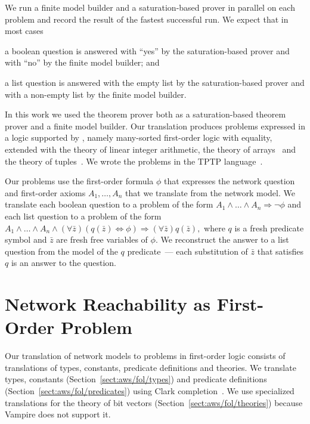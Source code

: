 

We run a finite model builder and a saturation-based prover in parallel on each problem and record the result of the fastest successful run. We expect that in most cases
\begin{enumerate*}[label=(\roman*)]
  \item a boolean question is answered with ``yes'' by the saturation-based prover and with ``no'' by the finite model builder; and
  \item a list question is answered with the empty list by the saturation-based prover and with a non-empty list by the finite model builder.
\end{enumerate*}

In this work we used the \vampire theorem prover both as a saturation-based theorem prover and a finite model builder. Our translation produces problems expressed in a logic supported by \vampire, namely many-sorted first-order logic with equality, extended with the theory of linear integer arithmetic, the theory of arrays~\cite{VampireAndFOOL} and the theory of tuples~\cite{KKV18}. We wrote the problems in the TPTP language~\cite{TPTP}.

Our problems use the first-order formula $\phi$ that expresses the network question and first-order axioms $A_1,\ldots,A_n$ that we translate from the network model. We translate each boolean question to a problem of the form $A_1\wedge\ldots\wedge A_n \Rightarrow \neg\phi$ and each list question to a problem of the form $A_1\wedge\ldots\wedge A_n \wedge (\forall \bar{z})(q(\bar{z})\Leftrightarrow \phi) \Rightarrow (\forall \bar{z})q(\bar{z}),$ where $q$ is a fresh predicate symbol and $\bar{z}$ are fresh free variables of $\phi$. We reconstruct the answer to a list question from the model of the $q$ predicate~--- each substitution of $\bar{z}$ that satisfies $q$ is an answer to the question.

\section{Network Reachability as First-Order Problem}\label{sect:aws/fol}
Our translation of network models to problems in first-order logic consists of translations of types, constants, predicate definitions and theories. We translate types, constants (Section~\ref{sect:aws/fol/types}) and predicate definitions (Section~\ref{sect:aws/fol/predicates}) using Clark completion~\cite{DBLP:conf/adbt/Clark77}. We use specialized translations for the theory of bit vectors (Section~\ref{sect:aws/fol/theories}) because Vampire does not support it.

